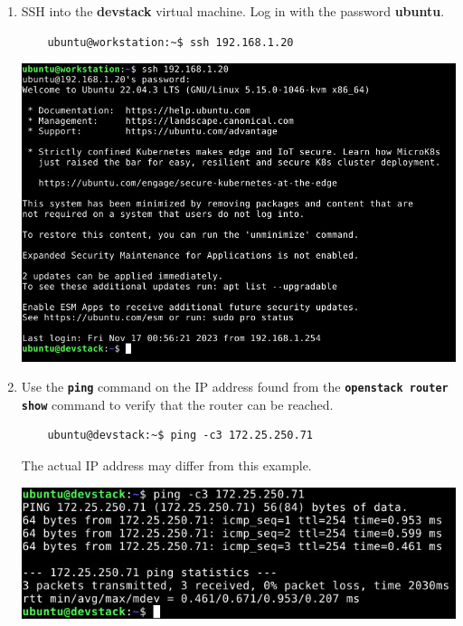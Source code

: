 \documentclass[letterpaper, 12pt]{article}
\begin{document}
\begin{enumerate}
    \item SSH into the \textbf{devstack} virtual machine. Log in with the password \textbf{ubuntu}.
    \begin{lstlisting}
    ubuntu@workstation:~$ ssh 192.168.1.20
    \end{lstlisting}

    \begin{center}
        \includegraphics[width=\linewidth]{images/part2/step17.png}
    \end{center}

    \item Use the \textbf{\texttt{ping}} command on the IP address found from the
    \textbf{\texttt{openstack router show}} command to verify that the router can be reached.
    \begin{lstlisting}
    ubuntu@devstack:~$ ping -c3 172.25.250.71
    \end{lstlisting}

    \begin{notebox}
        The actual IP address may differ from this example.
    \end{notebox}

    \begin{center}
        \includegraphics[width=\linewidth]{images/part2/step18.png}
    \end{center}


\end{enumerate}
\end{document}
